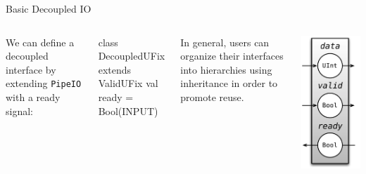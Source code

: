 \documentclass[xcolor=pdflatex,dvipsnames,table]{beamer}
\begin{document}
\begin{frame}[fragile]{Basic Decoupled IO}

\begin{columns}

We can define a decoupled interface by extending \verb+PipeIO+ with a ready signal:

\begin{scala}
class DecoupledUFix extends ValidUFix { 
  val ready = Bool(INPUT)
}
\end{scala}

\noindent
In general, users can organize their interfaces into hierarchies using inheritance in order to promote reuse.  


\begin{center}
\includegraphics[height=0.9\textheight]{figs/FIFOIO.pdf} 
\end{center}

\end{columns}

\end{frame}
\end{document}
